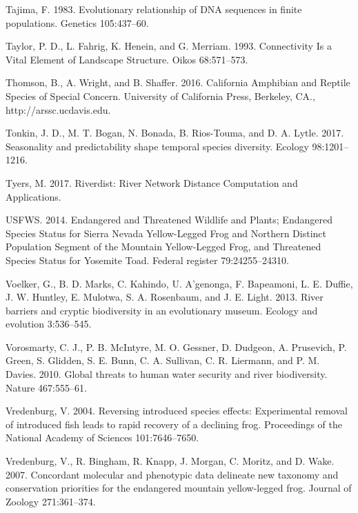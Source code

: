 \documentclass[proquest,12pt,final]{ucthesis-CA2012} %
\begin{document}
\begin{ucmainmatter}
\leavevmode\hypertarget{ref-tajima_evolutionary_1983}{}%
Tajima, F. 1983. Evolutionary relationship of DNA sequences in finite
populations. Genetics 105:437--60.

\leavevmode\hypertarget{ref-taylor_connectivity_1993}{}%
Taylor, P. D., L. Fahrig, K. Henein, and G. Merriam. 1993. Connectivity
Is a Vital Element of Landscape Structure. Oikos 68:571--573.

\leavevmode\hypertarget{ref-thomson_california_2016}{}%
Thomson, B., A. Wright, and B. Shaffer. 2016. California Amphibian and
Reptile Species of Special Concern. University of California Press,
Berkeley, CA., http://arssc.ucdavis.edu.

\leavevmode\hypertarget{ref-tonkin_seasonality_2017}{}%
Tonkin, J. D., M. T. Bogan, N. Bonada, B. Rios-Touma, and D. A. Lytle.
2017. Seasonality and predictability shape temporal species diversity.
Ecology 98:1201--1216.

\leavevmode\hypertarget{ref-tyers_riverdist_2017}{}%
Tyers, M. 2017. Riverdist: River Network Distance Computation and
Applications.

\leavevmode\hypertarget{ref-usfws_endangered_2014}{}%
USFWS. 2014. Endangered and Threatened Wildlife and Plants; Endangered
Species Status for Sierra Nevada Yellow-Legged Frog and Northern
Distinct Population Segment of the Mountain Yellow-Legged Frog, and
Threatened Species Status for Yosemite Toad. Federal register
79:24255--24310.

\leavevmode\hypertarget{ref-voelker_river_2013}{}%
Voelker, G., B. D. Marks, C. Kahindo, U. A'genonga, F. Bapeamoni, L. E.
Duffie, J. W. Huntley, E. Mulotwa, S. A. Rosenbaum, and J. E. Light.
2013. River barriers and cryptic biodiversity in an evolutionary museum.
Ecology and evolution 3:536--545.

\leavevmode\hypertarget{ref-vorosmarty_global_2010}{}%
Vorosmarty, C. J., P. B. McIntyre, M. O. Gessner, D. Dudgeon, A.
Prusevich, P. Green, S. Glidden, S. E. Bunn, C. A. Sullivan, C. R.
Liermann, and P. M. Davies. 2010. Global threats to human water security
and river biodiversity. Nature 467:555--61.

\leavevmode\hypertarget{ref-vredenburg_reversing_2004}{}%
Vredenburg, V. 2004. Reversing introduced species effects: Experimental
removal of introduced fish leads to rapid recovery of a declining frog.
Proceedings of the National Academy of Sciences 101:7646--7650.

\leavevmode\hypertarget{ref-vredenburg_concordant_2007}{}%
Vredenburg, V., R. Bingham, R. Knapp, J. Morgan, C. Moritz, and D. Wake.
2007. Concordant molecular and phenotypic data delineate new taxonomy
and conservation priorities for the endangered mountain yellow-legged
frog. Journal of Zoology 271:361--374.


\end{ucmainmatter}
\end{document}

